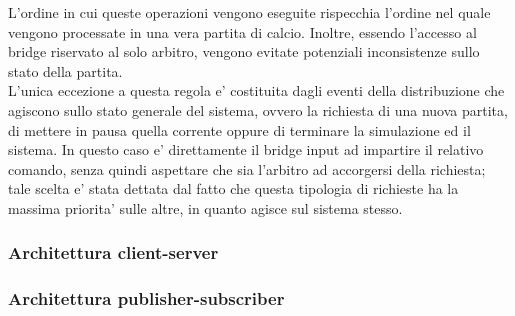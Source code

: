 L'ordine in cui queste operazioni vengono eseguite rispecchia l'ordine nel quale vengono processate in una vera partita di calcio. Inoltre, essendo l'accesso al bridge riservato al solo arbitro, vengono evitate potenziali inconsistenze sullo stato della partita.\\

L'unica eccezione a questa regola e' costituita dagli eventi della distribuzione che agiscono sullo stato generale del sistema, ovvero la richiesta di una nuova partita, di mettere in pausa quella corrente oppure di terminare la simulazione ed il sistema. In questo caso e' direttamente il bridge input ad impartire il relativo comando, senza quindi aspettare che sia l'arbitro ad accorgersi della richiesta; tale scelta e' stata dettata dal fatto che questa tipologia di richieste ha la massima priorita' sulle altre, in quanto agisce sul sistema stesso.

\subsubsection{Architettura client-server}
\label{sec:analisi_client_server}

\subsubsection{Architettura publisher-subscriber}
\label{sec:analisi_client_pusblisher_subscriber}